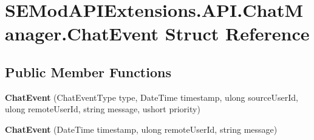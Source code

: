 \hypertarget{struct_s_e_mod_a_p_i_extensions_1_1_a_p_i_1_1_chat_manager_1_1_chat_event}{}\section{S\+E\+Mod\+A\+P\+I\+Extensions.\+A\+P\+I.\+Chat\+Manager.\+Chat\+Event Struct Reference}
\label{struct_s_e_mod_a_p_i_extensions_1_1_a_p_i_1_1_chat_manager_1_1_chat_event}
\subsection*{Public Member Functions}
\begin{DoxyCompactItemize}
\item 
\hypertarget{struct_s_e_mod_a_p_i_extensions_1_1_a_p_i_1_1_chat_manager_1_1_chat_event_a156fe98f9ff927198f76e0e443398bc0}{}{\bfseries Chat\+Event} (Chat\+Event\+Type type, Date\+Time timestamp, ulong source\+User\+Id, ulong remote\+User\+Id, string message, ushort priority)\label{struct_s_e_mod_a_p_i_extensions_1_1_a_p_i_1_1_chat_manager_1_1_chat_event_a156fe98f9ff927198f76e0e443398bc0}

\item 
\hypertarget{struct_s_e_mod_a_p_i_extensions_1_1_a_p_i_1_1_chat_manager_1_1_chat_event_a8f62779f5fb2034b742a50f3303064a8}{}{\bfseries Chat\+Event} (Date\+Time timestamp, ulong remote\+User\+Id, string message)\label{struct_s_e_mod_a_p_i_extensions_1_1_a_p_i_1_1_chat_manager_1_1_chat_event_a8f62779f5fb2034b742a50f3303064a8}

\end{DoxyCompactItemize}

